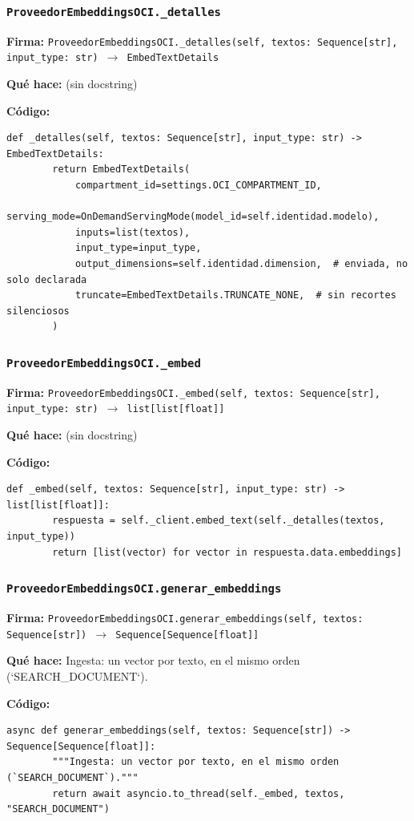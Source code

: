 \documentclass[11pt,a4paper]{article}
\begin{document}
\subsubsection*{\texttt{ProveedorEmbeddingsOCI.\_detalles}}
\textbf{Firma:} \texttt{ProveedorEmbeddingsOCI.\_detalles(self, textos: Sequence[str], input\_type: str) $\rightarrow$ EmbedTextDetails}

\textbf{Qué hace:} (sin docstring)

\textbf{Código:}
\begin{lstlisting}
def _detalles(self, textos: Sequence[str], input_type: str) -> EmbedTextDetails:
        return EmbedTextDetails(
            compartment_id=settings.OCI_COMPARTMENT_ID,
            serving_mode=OnDemandServingMode(model_id=self.identidad.modelo),
            inputs=list(textos),
            input_type=input_type,
            output_dimensions=self.identidad.dimension,  # enviada, no solo declarada
            truncate=EmbedTextDetails.TRUNCATE_NONE,  # sin recortes silenciosos
        )
\end{lstlisting}

\subsubsection*{\texttt{ProveedorEmbeddingsOCI.\_embed}}
\textbf{Firma:} \texttt{ProveedorEmbeddingsOCI.\_embed(self, textos: Sequence[str], input\_type: str) $\rightarrow$ list[list[float]]}

\textbf{Qué hace:} (sin docstring)

\textbf{Código:}
\begin{lstlisting}
def _embed(self, textos: Sequence[str], input_type: str) -> list[list[float]]:
        respuesta = self._client.embed_text(self._detalles(textos, input_type))
        return [list(vector) for vector in respuesta.data.embeddings]
\end{lstlisting}

\subsubsection*{\texttt{ProveedorEmbeddingsOCI.generar\_embeddings}}
\textbf{Firma:} \texttt{ProveedorEmbeddingsOCI.generar\_embeddings(self, textos: Sequence[str]) $\rightarrow$ Sequence[Sequence[float]]}

\textbf{Qué hace:} Ingesta: un vector por texto, en el mismo orden (`SEARCH\_DOCUMENT`).

\textbf{Código:}
\begin{lstlisting}
async def generar_embeddings(self, textos: Sequence[str]) -> Sequence[Sequence[float]]:
        """Ingesta: un vector por texto, en el mismo orden (`SEARCH_DOCUMENT`)."""
        return await asyncio.to_thread(self._embed, textos, "SEARCH_DOCUMENT")
\end{lstlisting}
\end{document}

